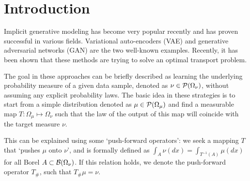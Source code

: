 
\section{Introduction}



Implicit generative modeling has become very popular recently and has proven successful in various fields. Variational auto-encoders (VAE) and generative adversarial networks (GAN) are the two well-known examples. Recently, it has been shown that these methods are trying to solve an optimal transport problem.


The goal in these approaches can be briefly described as learning the underlying probability measure of a given data sample, denoted as $\nu \in {\cal P}(\Omega_\nu)$, without assuming any explicit probability laws. The basic idea in these strategies is to start from a simple distribution denoted as $\mu \in {\cal P}(\Omega_\mu)$ and find a measurable map $T: \Omega_\mu \mapsto \Omega_\nu$ such that the law of the output of this map will coincide with the target measure $\nu$. 

This can be explained using some `push-forward operators': we seek a mapping $T$ that `pushes $\mu$ onto $\nu$', and is formally defined as $\int_A \nu(dx) = \int_{T^{-1}(A)} \mu(dx) $ for all Borel $A \subset {\cal B}(\Omega_\nu)$. If this relation holds, we denote the push-forward operator $T_\#$, such that $T_\# \mu = \nu$.

